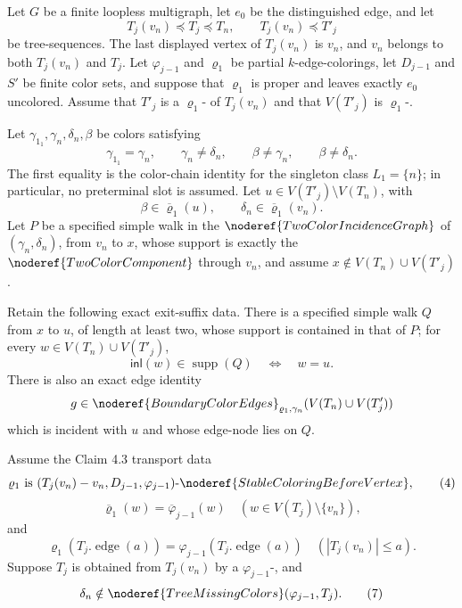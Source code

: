\begin{lemma}
Let \(G\) be a finite loopless multigraph, let \(e_0\) be the
distinguished edge, and let
\[
 T_j(v_n)\preccurlyeq T_j\preccurlyeq T_n,\qquad
 T_j(v_n)\preccurlyeq T'_j
\]
be tree-sequences.  The last displayed vertex of \(T_j(v_n)\) is
\(v_n\), and \(v_n\) belongs to both \(T_j(v_n)\) and \(T_j\).
Let \(\varphi_{j-1}\) and \(\varrho_1\) be partial \(k\)-edge-colorings,
let \(D_{j-1}\) and \(S'\) be finite color sets, and suppose that
\(\varrho_1\) is proper and leaves exactly \(e_0\) uncolored.  Assume
that \(T'_j\) is a \(\varrho_1\)- of
\(T_j(v_n)\) and that \(V(T'_j)\) is
\(\varrho_1\)-.

Let \(\gamma_{1_1},\gamma_n,\delta_n,\beta\) be colors satisfying
\[
 \gamma_{1_1}=\gamma_n,\qquad
 \gamma_n\ne\delta_n,\qquad
 \beta\ne\gamma_n,\qquad \beta\ne\delta_n.                    \tag{1}
\]
The first equality is the color-chain identity for the singleton class
\(L_1=\{n\}\); in particular, no preterminal slot is assumed.  Let
\(u\in V(T'_j)\setminus V(T_n)\), with
\[
 \beta\in\overline{\varrho}_1(u),\qquad
 \delta_n\in\overline{\varrho}_1(v_n).                         \tag{2}
\]
Let \(P\) be a specified simple walk in the
\(\noderef{TwoColorIncidenceGraph}\) of
\((\gamma_n,\delta_n)\), from \(v_n\) to \(x\), whose support is exactly
the \(\noderef{TwoColorComponent}\) through \(v_n\), and assume
\(x\notin V(T_n)\cup V(T'_j)\).

Retain the following exact exit-suffix data.  There is a specified simple
walk \(Q\) from \(x\) to \(u\), of length at least two, whose support is
contained in that of \(P\); for every
\(w\in V(T_n)\cup V(T'_j)\),
\[
 \mathsf{inl}(w)\in\operatorname{supp}(Q)\quad\Longleftrightarrow\quad
 w=u.                                                         \tag{3}
\]
There is also an exact edge identity
\[
 g\in\noderef{BoundaryColorEdges}_{\varrho_1,\gamma_n}
       (V(T_n)\cup V(T'_j))
\]
which is incident with \(u\) and whose edge-node lies on \(Q\).

Assume the Claim 4.3 transport data
\[
 \varrho_1\text{ is }
 (T_j(v_n)-v_n,D_{j-1},\varphi_{j-1})
 \text{-}\noderef{StableColoringBeforeVertex},                 \tag{4}
\]
\[
 \overline{\varrho}_1(w)=\overline{\varphi}_{j-1}(w)
 \quad(w\in V(T_j)\setminus\{v_n\}),                           \tag{5}
\]
and
\[
 \varrho_1(T_j.\operatorname{edge}(a))
 =\varphi_{j-1}(T_j.\operatorname{edge}(a))
 \quad(|T_j(v_n)|\le a).                                      \tag{6}
\]
Suppose \(T_j\) is obtained from \(T_j(v_n)\) by a
\(\varphi_{j-1}\)-, and
\[
 \delta_n\notin\noderef{TreeMissingColors}(\varphi_{j-1},T_j). \tag{7}
\]


\end{lemma}
